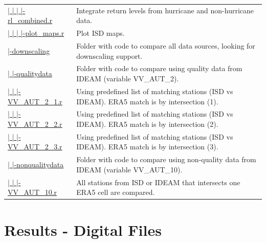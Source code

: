 \documentclass[12pt,oneside]{reedthesis}
\begin{document}
\begin{longtable}[t]{>{\raggedright\arraybackslash}p{1.3in}>{\raggedright\arraybackslash}p{4.9in}}
\href{ftp://ftp.geocorp.co/windthesis/code/pot_pp/isd/maps/return_levels_combined.r}{  |    |    |    |-rl\_combined.r} & Integrate return levels from hurricane and non-hurricane data.\\
\href{ftp://ftp.geocorp.co/windthesis/code/pot_pp/isd/maps/plot_maps.r}{  |    |    |    |-plot\_maps.r} & Plot ISD maps.\\
\href{ftp://ftp.geocorp.co/windthesis/code/downscaling/}{  |-downscaling} & Folder with code to compare all data sources, looking for downscaling support.\\
\href{ftp://ftp.geocorp.co/windthesis/code/downscaling/qualitydata/}{  |    |-qualitydata} & Folder with code to compare using quality data from IDEAM (variable VV\_AUT\_2).\\
\href{ftp://ftp.geocorp.co/windthesis/code/downscaling/qualitydata/comparing_VV_AUT_2_1.r}{  |    |    |-VV\_AUT\_2\_1.r} & Using predefined list of matching stations (ISD vs IDEAM). ERA5 match is by intersection (1).\\
\href{ftp://ftp.geocorp.co/windthesis/code/downscaling/qualitydata/comparing_VV_AUT_2_2.r}{  |    |    |-VV\_AUT\_2\_2.r} & Using predefined list of matching stations (ISD vs IDEAM). ERA5 match is by intersection (2).\\
\href{ftp://ftp.geocorp.co/windthesis/code/downscaling/qualitydata/comparing_VV_AUT_2_3.r}{  |    |    |-VV\_AUT\_2\_3.r} & Using predefined list of matching stations (ISD vs IDEAM). ERA5 match is by intersection (3).\\
\href{ftp://ftp.geocorp.co/windthesis/code/downscaling/nonqualitydata/}{  |    |-nonqualitydata} & Folder with code to compare using non-quality data from IDEAM (variable VV\_AUT\_10).\\
\href{ftp://ftp.geocorp.co/windthesis/code/downscaling/nonqualitydata/comparing_VV_AUT_10.r}{  |    |    |-VV\_AUT\_10.r} & All stations from ISD or IDEAM that intersects one ERA5 cell are compared.\\
\bottomrule
\end{longtable}
\endgroup{}

\hypertarget{results}{%
\chapter{Results - Digital Files}\label{results}}
\end{document}
